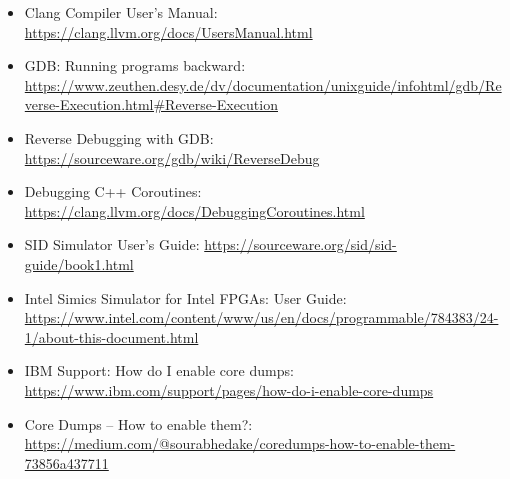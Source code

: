 \begin{itemize}
\item
Clang Compiler User’s Manual: \url{https://clang.llvm.org/docs/UsersManual.html}

\item
GDB: Running programs backward: \url{https://www.zeuthen.desy.de/dv/documentation/unixguide/infohtml/gdb/Reverse-Execution.html#Reverse-Execution}

\item
Reverse Debugging with GDB: \url{https://sourceware.org/gdb/wiki/ReverseDebug}

\item
Debugging C++ Coroutines: \url{https://clang.llvm.org/docs/DebuggingCoroutines.html}

\item
SID Simulator User’s Guide: \url{https://sourceware.org/sid/sid-guide/book1.html}

\item
Intel Simics Simulator for Intel FPGAs: User Guide: \url{https://www.intel.com/content/www/us/en/docs/programmable/784383/24-1/about-this-document.html}

\item
IBM Support: How do I enable core dumps: \url{https://www.ibm.com/support/pages/how-do-i-enable-core-dumps}

\item
Core Dumps – How to enable them?: \url{https://medium.com/@sourabhedake/coredumps-how-to-enable-them-73856a437711}
\end{itemize}